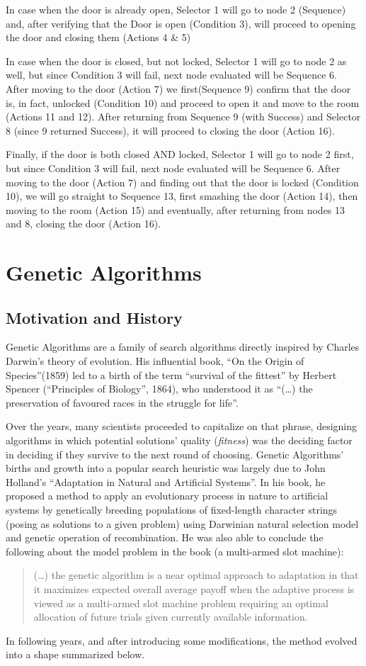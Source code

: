 In case when the door is already open, Selector 1 will go to node 2 (Sequence) and, after verifying that the Door is open (Condition 3), will proceed to opening the door and closing them (Actions 4 \& 5)

In case when the door is closed, but not locked, Selector 1 will go to node 2 as well, but since Condition 3 will fail, next node evaluated will be Sequence 6. After moving to the door (Action 7) we first(Sequence 9) confirm that the door is, in fact, unlocked (Condition 10) and proceed to open it and move to the room (Actions 11 and 12). After returning from Sequence 9 (with Success) and Selector 8 (since 9 returned Success), it will proceed to closing the door (Action 16).

Finally, if the door is both closed AND locked, Selector 1 will go to node 2 first, but since Condition 3 will fail, next node evaluated will be Sequence 6. After moving to the door (Action 7) and finding out that the door is locked (Condition 10), we will go straight to Sequence 13, first smashing the door (Action 14), then moving to the room (Action 15) and eventually, after returning from nodes 13 and 8, closing the door (Action 16).
\section{Genetic Algorithms}
\subsection{Motivation and History}
Genetic Algorithms are a family of search algorithms directly inspired by Charles Darwin’s theory of evolution. His influential book, ``On the Origin of Species''(1859) led to a birth of the term ``survival of the fittest'' by Herbert Spencer (``Principles of Biology'', 1864), who understood it as \enquote{(\ldots) the preservation of favoured races in the struggle for life}.

Over the years, many scientists proceeded to capitalize on that phrase, designing algorithms in which potential solutions' quality (\textit{fitness}) was the deciding factor in deciding if they survive to the next round of choosing. %
Genetic Algorithms' births and growth into a popular search heuristic was largely due to John Holland's ``Adaptation in Natural and Artificial Systems''. In his book, he proposed a method to apply an evolutionary process in nature to artificial systems by genetically breeding populations of fixed-length character strings (posing as solutions to a given problem) using Darwinian natural selection model and genetic operation of recombination. He was also able to conclude the following about the model problem in the book (a multi-armed slot machine)\cite{kozagp}:
\begin{quote}
   (\ldots) the genetic algorithm is a near optimal approach to adaptation in that it maximizes expected overall average payoff when the adaptive process is viewed as a multi-armed slot machine problem requiring an optimal allocation of future trials given currently available information.
\end{quote}
In following years, and after introducing some modifications, the method evolved into a shape summarized below.

